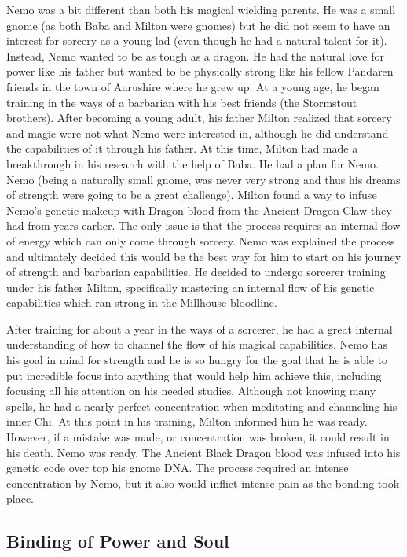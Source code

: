 \documentclass[letterpaper,10pt,twoside,twocolumn,openany]{book}
\begin{document}
Nemo was a bit different than both his magical wielding parents. He was a small gnome (as both Baba and Milton were gnomes) but he did not seem to have an interest for sorcery as a young lad (even though he had a natural talent for it). Instead, Nemo wanted to be as tough as a dragon. He had the natural love for power like his father but wanted to be physically strong like his fellow Pandaren friends in the town of Aurushire where he grew up. At a young age, he began training in the ways of a barbarian with his best friends (the Stormstout brothers). After becoming a young adult, his father Milton realized that sorcery and magic were not what Nemo were interested in, although he did understand the capabilities of it through his father. At this time, Milton had made a breakthrough in his research with the help of Baba. He had a plan for Nemo. Nemo (being a naturally small gnome, was never very strong and thus his dreams of strength were going to be a great challenge). Milton found a way to infuse Nemo's genetic makeup with Dragon blood from the Ancient Dragon Claw they had from years earlier. The only issue is that the process requires an internal flow of energy which can only come through sorcery. Nemo was explained the process and ultimately decided this would be the best way for him to start on his journey of strength and barbarian capabilities. He decided to undergo sorcerer training under his father Milton, specifically mastering an internal flow of his genetic capabilities which ran strong in the Millhouse bloodline.

After training for about a year in the ways of a sorcerer, he had a great internal understanding of how to channel the flow of his magical capabilities. Nemo has his goal in mind for strength and he is so hungry for the goal that he is able to put incredible focus into anything that would help him achieve this, including focusing all his attention on his needed studies. Although not knowing many spells, he had a nearly perfect concentration when meditating and channeling his inner Chi. At this point in his training, Milton informed him he was ready. However, if a mistake was made, or concentration was broken, it could result in his death. Nemo was ready. The Ancient Black Dragon blood was infused into his genetic code over top his gnome DNA. The process required an intense concentration by Nemo, but it also would inflict intense pain as the bonding took place.

\subsection{Binding of Power and Soul}
\end{document}
